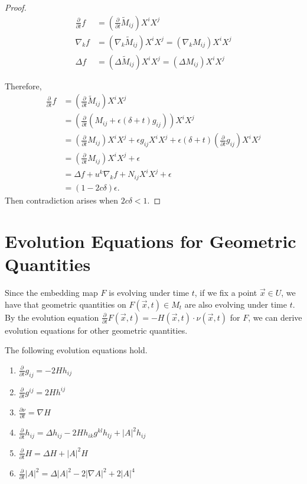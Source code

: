 \begin{proof}
	\begin{align*}
		\frac{\partial }{\partial t} f&=(\frac{\partial }{\partial t} \tilde{M}_{ij }^{}) X^i X^j\\
		\nabla_k f&= (\nabla_k \tilde{M}_{ij }^{}) X^i X^j = (\nabla_k M_{ij }^{} )X^i X^j\\
		\Delta f &= (\Delta  \tilde{M}_{ij }^{}) X^i X^j = (\Delta M_{ij }^{} )X^i X^j
	\end{align*}
	
	Therefore,
	\begin{equation*}
	\begin{split}
		\frac{\partial }{\partial t} f
		&=(\frac{\partial }{\partial t} \tilde{M}_{ij }^{}) X^i X^j\\
	&= (\frac{\partial }{\partial t} (M_{ij }^{} + \epsilon (\delta +t) g_{ij }^{} )) X^i X^j\\
	&= (\frac{\partial }{\partial t} M_{ij }^{} ) X^i X^j +\epsilon g_{ij }^{} X^i X^j+ \epsilon (\delta +t)(\frac{\partial }{\partial t} g_{ij }^{}) X^i X^j\\
	&= (\frac{\partial }{\partial t} M_{ij }^{} ) X^i X^j +\epsilon\\
	&= \Delta f + u^k \nabla_{k}^{} f +N_{ij }^{} X^i X^j + \epsilon \\
	&= (1-2c \delta ) \epsilon.
	\end{split}
	\end{equation*}
	Then contradiction arises when $2c \delta <1.$ 
\end{proof}

\section{Evolution Equations for Geometric Quantities}



Since the embedding map $F$ is evolving under time $t$, if we fix a point $\vec{x} \in U$, we have that geometric quantities on $F(\vec{x},t) \in M_t$ are also evolving under time $t$. By the evolution equation $\frac{\partial }{\partial t} F(\vec{x},t)=-H(\vec{x},t) \cdot \nu (\vec{x},t)$ for $F$, we can derive evolution equations for other geometric quantities.

\begin{lemma}
	The following evolution equations hold.
	\begin{enumerate}

		\item $\frac{\partial }{\partial t} g_{ij}=-2Hh_{ij}$
		\item $\frac{\partial }{\partial t} g^{ij}=2Hh^{ij}$
		\item $\frac{\partial \nu }{\partial t} = \nabla H$
		\item $\frac{\partial }{\partial t} h_{ij}=\Delta h_{ij}-2Hh_{ik}g^{kl}h_{lj}+\left| A \right| ^2 h_{ij}$
		\item $\frac{\partial }{\partial t} H=\Delta H+ \left| A \right| ^2 H$
		\item $\frac{\partial }{\partial t} \left| A \right| ^2 = \Delta \left| A \right| ^2 - 2 \left| \nabla A \right| ^2 + 2 \left| A \right| ^4$
	\end{enumerate}
\end{lemma}

